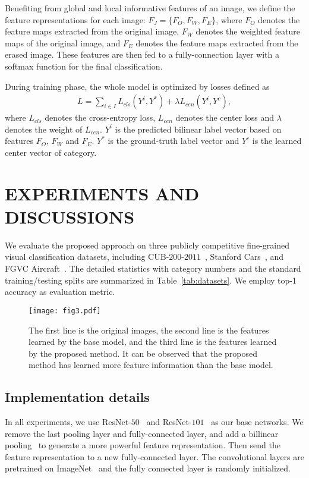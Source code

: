 \documentclass[conference]{IEEEtran}
\begin{document}
Benefiting from global and local informative features of an image, we define the feature representations for each image: $F_{J}=\{F_{O},F_{W},F_{E}\}$, where $F_{O}$ denotes the feature maps extracted from the original image, $F_{W}$ denotes the weighted feature maps of the original image, and $F_{E}$ denotes the feature maps extracted from the erased image. These features are then fed to a fully-connection layer with a softmax function for the final classification.

During training phase, the whole model is optimized by losses defined as
\begin{eqnarray}
L=\sum_{i\in I}L_{cls}(Y^{i},Y^{*})+\lambda L_{cen}(Y^{i},Y^{c}),
\end{eqnarray}
where $L_{cls}$ denotes the cross-entropy loss,  $L_{cen}$ denotes the center loss and $\lambda$ denotes the weight of $L_{cen}$. $Y^{i}$ is the predicted bilinear label vector based on features $F_{O}$, $F_{W}$ and $F_{E}$. $Y^{*}$ is the ground-truth label vector and $Y^{c}$ is the learned center vector of category.

\section{EXPERIMENTS AND DISCUSSIONS}

We evaluate the proposed approach on three publicly competitive fine-grained visual classification datasets, including CUB-$200$-$2011$~\cite{wah2011caltech}, Stanford Cars~\cite{krause20133d}, and FGVC Aircraft~\cite{maji13fine}. The detailed statistics with category numbers and the standard training/testing splits are summarized in Table~\ref{tab:datasets}. We employ top-1 accuracy as evaluation metric.

\begin{figure*}[ht]
\centering
\texttt{[image: fig3.pdf]}
\caption{The first line is the original images, the second line is the features learned by the base model, and the third line is the features learned by the proposed method. It can be observed that the proposed method has learned more feature information than the base model.}
\label{fig:visualization}
\end{figure*}

\subsection{Implementation details}
In all experiments, we use ResNet-$50$~\cite{he2016deep} and ResNet-$101$~\cite{he2016deep} as our base networks. We remove the last pooling layer and fully-connected layer, and add a billinear pooling~\cite{lin2015bilinear} to generate a more powerful feature representation. Then send the feature representation to a new fully-connected layer. The convolutional layers are pretrained on ImageNet~\cite{deng2009imagenet} and the fully connected layer is randomly initialized.
\end{document}
